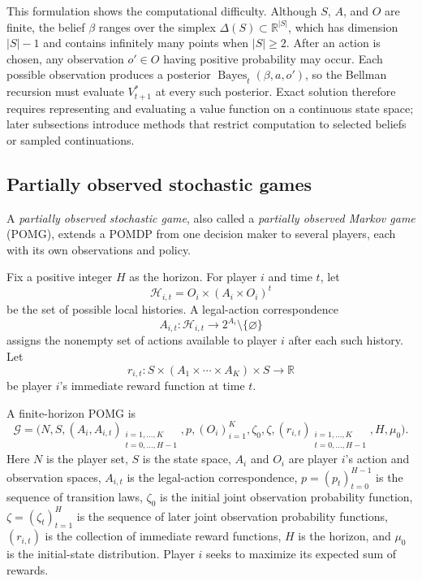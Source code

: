 This formulation shows the computational difficulty. Although $S$, $A$, and $O$ are finite, the belief $\beta$ ranges over the simplex $\Delta(S)\subset\mathbb{R}^{|S|}$, which has dimension $|S|-1$ and contains infinitely many points when $|S|\geq2$. After an action is chosen, any observation $o'\in O$ having positive probability may occur. Each possible observation produces a posterior $\operatorname{Bayes}_t(\beta,a,o')$, so the Bellman recursion must evaluate $V_{t+1}^\ast$ at every such posterior. Exact solution therefore requires representing and evaluating a value function on a continuous state space; later subsections introduce methods that restrict computation to selected beliefs or sampled continuations.

\subsection{Partially observed stochastic games}
\label{app:partially-observed-games}

A \emph{partially observed stochastic game}, also called a \emph{partially observed Markov game} (POMG), extends a POMDP from one decision maker to several players, each with its own observations and policy.

Fix a positive integer $H$ as the horizon.
For player $i$ and time $t$, let
\[
    \mathcal{H}_{i,t}
    =
    O_i\times(A_i\times O_i)^t
\]
be the set of possible local histories. A legal-action correspondence
\[
    A_{i,t}:\mathcal{H}_{i,t}\to 2^{A_i}\setminus\{\varnothing\}
\]
assigns the nonempty set of actions available to player $i$ after each such history. Let
\[
    r_{i,t}:S\times(A_1\times\cdots\times A_K)\times S\to\mathbb{R}
\]
be player $i$'s immediate reward function at time $t$.

A finite-horizon POMG is
\begin{equation}
\label{eq:pomg-model}
    \mathcal{G}
    =
    \bigl(
      N,S,(A_i,A_{i,t})_{\substack{i=1,\ldots,K\\t=0,\ldots,H-1}},p,
      (O_i)_{i=1}^K,\zeta_0,\zeta,
      (r_{i,t})_{\substack{i=1,\ldots,K\\t=0,\ldots,H-1}},H,\mu_0
    \bigr).
\end{equation}
Here $N$ is the player set, $S$ is the state space, $A_i$ and $O_i$ are player $i$'s action and observation spaces, $A_{i,t}$ is the legal-action correspondence, $p=(p_t)_{t=0}^{H-1}$ is the sequence of transition laws, $\zeta_0$ is the initial joint observation probability function, $\zeta=(\zeta_t)_{t=1}^H$ is the sequence of later joint observation probability functions, $(r_{i,t})$ is the collection of immediate reward functions, $H$ is the horizon, and $\mu_0$ is the initial-state distribution. Player $i$ seeks to maximize its expected sum of rewards.

